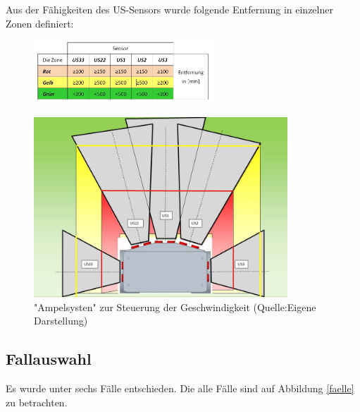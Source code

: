Aus der Fähigkeiten des US-Sensors wurde folgende Entfernung in einzelner Zonen definiert:
\begin{figure}[!h]  %
	\centering\includegraphics[width=0.60\textwidth]{images/entf.jpg}
	\label{entf} %
\end{figure}

\begin{figure}[!h]  %
	\centering\includegraphics[width=0.85\textwidth]{images/H-UMF.jpg}
	\caption{ "Ampelsysten" zur Steuerung der Geschwindigkeit (Quelle:Eigene Darstellung)}
	\label{zone} %
\end{figure}

\subsection{Fallauswahl}

Es wurde unter sechs Fälle entschieden. Die alle Fälle sind auf Abbildung \ref{faelle} zu betrachten.

